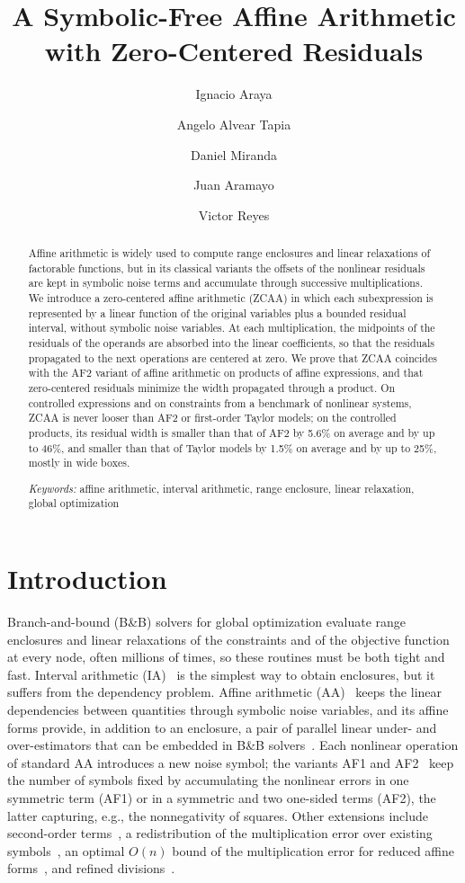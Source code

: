 \documentclass[10pt]{article}
\title{A Symbolic-Free Affine Arithmetic with Zero-Centered Residuals}
\author{Ignacio Araya \and Angelo Alvear Tapia \and Daniel Miranda \and Juan Aramayo \and Victor Reyes}
\date{}
\begin{document}
\maketitle

\begin{abstract}
Affine arithmetic is widely used to compute range enclosures and linear relaxations of factorable functions, but in its classical variants the offsets of the nonlinear residuals are kept in symbolic noise terms and accumulate through successive multiplications. We introduce a zero-centered affine arithmetic (ZCAA) in which each subexpression is represented by a linear function of the original variables plus a bounded residual interval, without symbolic noise variables. At each multiplication, the midpoints of the residuals of the operands are absorbed into the linear coefficients, so that the residuals propagated to the next operations are centered at zero. We prove that ZCAA coincides with the AF2 variant of affine arithmetic on products of affine expressions, and that zero-centered residuals minimize the width propagated through a product. On controlled expressions and on constraints from a benchmark of nonlinear systems, ZCAA is never looser than AF2 or first-order Taylor models; on the controlled products, its residual width is smaller than that of AF2 by 5.6\% on average and by up to 46\%, and smaller than that of Taylor models by 1.5\% on average and by up to 25\%, mostly in wide boxes.

\medskip\noindent
\textit{Keywords:} affine arithmetic, interval arithmetic, range enclosure, linear relaxation, global optimization
\end{abstract}

\section{Introduction}

Branch-and-bound (B\&B) solvers for global optimization evaluate range enclosures and linear relaxations of the constraints and of the objective function at every node, often millions of times, so these routines must be both tight and fast. Interval arithmetic (IA)~\cite{moore1966} is the simplest way to obtain enclosures, but it suffers from the dependency problem. Affine arithmetic (AA)~\cite{combastolfi1993} keeps the linear dependencies between quantities through symbolic noise variables, and its affine forms provide, in addition to an enclosure, a pair of parallel linear under- and over-estimators that can be embedded in B\&B solvers~\cite{ninin2015reliable,araya2025hybridizing}. Each nonlinear operation of standard AA introduces a new noise symbol; the variants AF1 and AF2~\cite{messine2002extentions} keep the number of symbols fixed by accumulating the nonlinear errors in one symmetric term (AF1) or in a symmetric and two one-sided terms (AF2), the latter capturing, e.g., the nonnegativity of squares. Other extensions include second-order terms~\cite{LIAO2020105440,messine2006general}, a redistribution of the multiplication error over existing symbols~\cite{kumar}, an optimal $O(n)$ bound of the multiplication error for reduced affine forms~\cite{skalna2017new}, and refined divisions~\cite{jacquemin2019dividing}.
\end{document}
